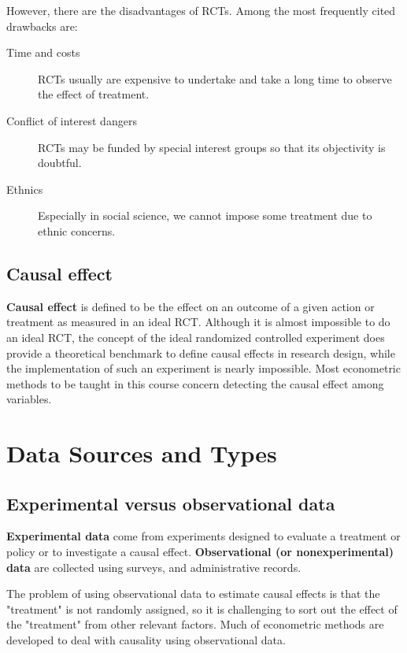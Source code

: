 \documentclass[a4paper,11pt]{article}
\begin{document}
However, there are the disadvantages of RCTs. Among the most
frequently cited drawbacks are:
\begin{description}
\item[{Time and costs}] RCTs usually are expensive to undertake and take a
long time to observe the effect of treatment.
\item[{Conflict of interest dangers}] RCTs may be funded by special interest
groups so that its objectivity is doubtful.
\item[{Ethnics}] Especially in social science, we cannot impose some
treatment due to ethnic concerns.
\end{description}


\subsection*{Causal effect}
\label{sec:org9ce497b}

\textbf{Causal effect} is defined to be the effect on an outcome of a given
action or treatment as measured in an ideal RCT. Although it is almost
impossible to do an ideal RCT, the concept of the ideal randomized
controlled experiment does provide a theoretical benchmark to define
causal effects in research design, while the implementation of such an
experiment is nearly impossible. Most econometric methods to be taught
in this course concern detecting the causal effect among variables. 


\section{Data Sources and Types}
\label{sec:orge243688}

\subsection*{Experimental versus observational data}
\label{sec:orgb4f8813}

\textbf{Experimental data} come from experiments designed to evaluate a
treatment or policy or to investigate a causal effect. \textbf{Observational
(or nonexperimental) data} are collected using surveys, and
administrative records.

The problem of using observational data to estimate causal effects is
that the "treatment" is not randomly assigned, so it is challenging to
sort out the effect of the "treatment" from other relevant
factors. Much of econometric methods are developed to deal with
causality using observational data.
\end{document}
